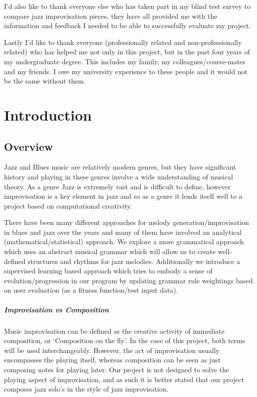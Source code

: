 \documentclass[pdftex,12pt,a4paper]{report}
\begin{document}
I'd also like to thank everyone else who has taken part in my blind test survey to compare jazz improvisation pieces, they have all provided me with the information and feedback I needed to be able to successfully evaluate my project.

Lastly I'd like to thank everyone (professionally related and non-professionally related) who has helped me not only in this project, but in the past four years of my undergraduate degree. This includes my family, my colleagues/course-mates and my friends. I owe my university experience to these people and it would not be the same without them.

\setcounter{tocdepth}{2} %

\tableofcontents

\pagebreak

\renewcommand*\thesection{\arabic{section}}
 
\pagebreak

\chapter{Introduction}

\section{Overview}
Jazz and Blues music are relatively modern genres, but they have significant history and playing in these genres involve a wide understanding of musical theory. As a genre Jazz is extremely vast and is difficult to define, however improvisation is a key element in jazz and so as a genre it lends itself well to a project based on computational creativity.

There have been many different approaches for melody generation/improvisation in blues and jazz over the years and many of them have involved an analytical (mathematical/statistical) approach. We explore a more grammatical approach which uses an abstract musical grammar which will allow us to create well-defined structures and rhythms for jazz melodies. Additionally we introduce a supervised learning based approach which tries to embody a sense of evolution/progression in our program by updating grammar rule weightings based on user evaluation (as a fitness function/test input data). 

\paragraph{Improvisation vs Composition}
Music improvisation can be defined as the creative activity of immediate composition, or `Composition on the fly'. In the case of this project, both terms will be used interchangeably. However, the act of improvisation usually encompasses the playing itself, whereas composition can be seen as just composing notes for playing later. Our project is not designed to solve the playing aspect of improvisation, and as such it is better stated that our project composes jazz solo's in the style of jazz improvisation.
\end{document}
